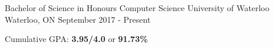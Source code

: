 
\begin{cventries}
  \cventry
    {Bachelor of Science in Honours Computer Science} %
    {University of Waterloo} %
    {Waterloo, ON} %
    {September 2017 - Present} %
    {
      \begin{cvitems} %
        \item {Cumulative GPA: \textbf{3.95/4.0} or \textbf{91.73\%}}
      \end{cvitems}
    }
\end{cventries}

